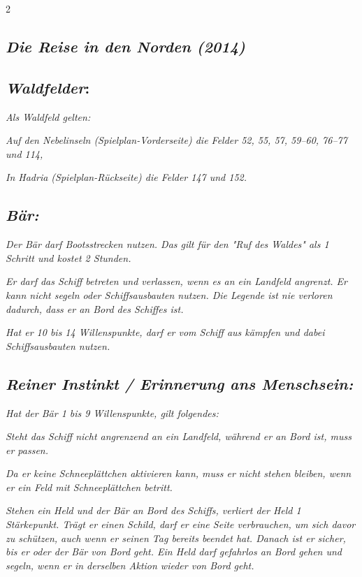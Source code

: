 \documentclass[10pt, a4paper, oneside]{book}
\newcommand{\fan}[1]{\textit{#1}}
\begin{document}
\begin{multicols*}{2}
\begin{bgcolor}
\section{\fan{Die Reise in den Norden (2014)}}






\subsection{\fan{Waldfelder}:}

\fan{Als Waldfeld gelten:}

\bullet{} \fan{Auf den Nebelinseln (Spielplan-Vorderseite) die Felder 52, 55, 57, 59–60, 76–77 und 114,}

\bullet{} \fan{In Hadria (Spielplan-Rückseite) die Felder 147 und 152.}





\subsection{\fan{Bär:}}

\fan{Der Bär darf Bootsstrecken nutzen. Das gilt für den "Ruf des Waldes" als 1 Schritt und kostet 2 Stunden.}

\fan{Er darf das Schiff betreten und verlassen, wenn es an ein Landfeld angrenzt. Er kann nicht segeln oder Schiffsausbauten nutzen. Die Legende ist nie verloren dadurch, dass er an Bord des Schiffes ist.}

\fan{Hat er 10 bis 14 Willenspunkte, darf er vom Schiff aus kämpfen und dabei Schiffsausbauten nutzen.}






\subsection{\fan{Reiner Instinkt / Erinnerung ans Menschsein:}}

\fan{Hat der Bär 1 bis 9 Willenspunkte, gilt folgendes:}

\bullet{} \fan{Steht das Schiff nicht angrenzend an ein Landfeld, während er an Bord ist, muss er passen.}

\bullet{} \fan{Da er keine Schneeplättchen aktivieren kann, muss er nicht stehen bleiben, wenn er ein Feld mit Schneeplättchen betritt.}

\bullet{} \fan{Stehen ein Held und der Bär an Bord des Schiffs, verliert der Held 1 Stärkepunkt. Trägt er einen Schild, darf er eine Seite verbrauchen, um sich davor zu schützen, auch wenn er seinen Tag bereits beendet hat. Danach ist er sicher, bis er oder der Bär von Bord geht. Ein Held darf gefahrlos an Bord gehen und segeln, wenn er in derselben Aktion wieder von Bord geht.}







\end{bgcolor}
\end{multicols*}
\end{document}
